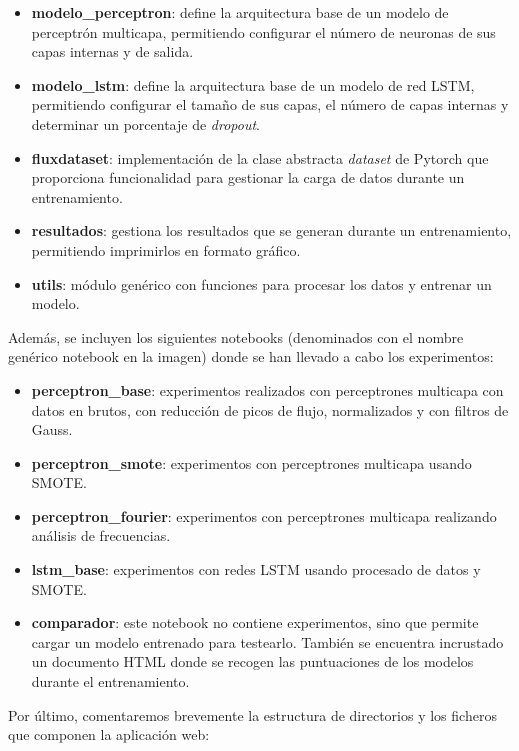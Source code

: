 \begin{itemize}
    \item \textbf{modelo\_perceptron}: define la arquitectura base de un modelo de perceptrón multicapa, permitiendo configurar el número de neuronas de sus capas internas y de salida.
    \item \textbf{modelo\_lstm}: define la arquitectura base de un modelo de red LSTM, permitiendo configurar el tamaño de sus capas, el número de capas internas y determinar un porcentaje de \textit{dropout}.
    \item \textbf{fluxdataset}: implementación de la clase abstracta \textit{dataset} de Pytorch que proporciona funcionalidad para gestionar la carga de datos durante un entrenamiento.
    \item \textbf{resultados}: gestiona los resultados que se generan durante un entrenamiento, permitiendo imprimirlos en formato gráfico.
    \item \textbf{utils}: módulo genérico con funciones para procesar los datos y entrenar un modelo.
\end{itemize}


Además, se incluyen los siguientes notebooks (denominados con el nombre genérico notebook en la imagen) donde se han llevado a cabo los experimentos:

\begin{itemize}
    \item \textbf{perceptron\_base}: experimentos realizados con perceptrones multicapa con datos en brutos, con reducción de picos de flujo, normalizados y con filtros de Gauss.
    \item \textbf{perceptron\_smote}: experimentos con perceptrones multicapa usando SMOTE.
    \item \textbf{perceptron\_fourier}: experimentos con perceptrones multicapa realizando análisis de frecuencias.
    \item \textbf{lstm\_base}: experimentos con redes LSTM usando procesado de datos y SMOTE.
    \item \textbf{comparador}: este notebook no contiene experimentos, sino que permite cargar un modelo entrenado para testearlo. También se encuentra incrustado un documento HTML donde se recogen las puntuaciones de los modelos durante el entrenamiento.
\end{itemize}

Por último, comentaremos brevemente la estructura de directorios y los ficheros que componen la aplicación web:

